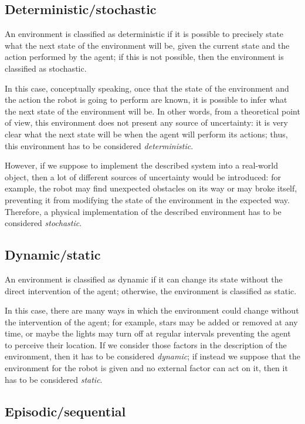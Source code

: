 \documentclass[letterpaper,headings=standardclasses]{scrartcl}
\begin{document}
\subsection{Deterministic/stochastic}

An environment is classified as deterministic if it is possible to precisely state what the next state of the environment will be, given the current state and the action performed by the agent; if this is not possible, then the environment is classified as stochastic.

In this case, conceptually speaking, once that the state of the environment and the action the robot is going to perform are known, it is possible to infer what the next state of the environment will be. In other words, from a theoretical point of view, this environment does not present any source of uncertainty: it is very clear what the next state will be when the agent will perform its actions; thus, this environment has to be considered \emph{deterministic}.

However, if we suppose to implement the described system into a real-world object, then a lot of different sources of uncertainty would be introduced: for example, the robot may find unexpected obstacles on its way or may broke itself, preventing it from modifying the state of the environment in the expected way. Therefore, a physical implementation of the described environment has to be considered \emph{stochastic}.

\subsection{Dynamic/static}

An environment is classified as dynamic if it can change its state without the direct intervention of the agent; otherwise, the environment is classified as static.

In this case, there are many ways in which the environment could change without the intervention of the agent; for example, stars may be added or removed at any time, or maybe the lights may turn off at regular intervals preventing the agent to perceive their location. If we consider those factors in the description of the environment, then it has to be considered \emph{dynamic}; if instead we suppose that the environment for the robot is given and no external factor can act on it, then it has to be considered \emph{static}.

\subsection{Episodic/sequential}
\end{document}
